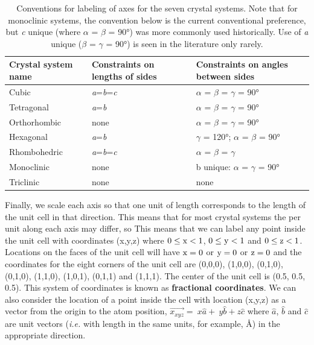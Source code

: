 \begin{table}
\centering
\caption{Conventions for labeling of axes for the seven crystal systems. Note that for monoclinic systems, the convention below is the current conventional preference, but \textit{c} unique (where $\alpha$ = $\beta$ = 90°) was more commonly used historically. Use of \textit{a} unique ($\beta$ = $\gamma$ = 90°) is seen in the literature only rarely.}
\label{tab:conventions}

\begin{tabular}{| l | p{} | p{} |}

\hline
Crystal system name & Constraints on lengths of sides & Constraints on angles between sides \\
\hline
Cubic & \textit{a}=\textit{b}=\textit{c} & $\alpha$ = $\beta$ = $\gamma$ = 90° \\
\hline
Tetragonal & \textit{a}=\textit{b} & $\alpha$ = $\beta$ = $\gamma$ = 90° \\
\hline
Orthorhombic & none & $\alpha$ = $\beta$ = $\gamma$ = 90° \\
\hline
Hexagonal & \textit{a}=\textit{b} & $\gamma$ = 120°; $\alpha$ = $\beta$ = 90° \\
\hline
Rhombohedric & \textit{a}=\textit{b}=\textit{c} & $\alpha$ = $\beta$ = $\gamma$ \\
\hline
Monoclinic & none & b unique: $\alpha$ = $\gamma$ = 90° \\
\hline
Triclinic & none & none \\
\hline

\end{tabular}

\end{table}

 Finally, we scale each axis so that one unit of length corresponds to the length of the unit cell in that direction. This means that for most crystal systems the per unit along each axis may differ, so This means that we can label any point inside the unit cell with coordinates (x,y,z) where $0\leq \rm x<1$, $0\leq \rm y<1$ and $0\leq\rm z<1$. Locations on the faces of the unit cell will have $\rm x=0$ or $\rm y=0$ or $\rm z=0$ and the coordinates for the eight corners of the unit cell are (0,0,0), (1,0,0), (0,1,0), (0,1,0), (1,1,0), (1,0,1), (0,1,1) and (1,1,1). The center of the unit cell is (0.5, 0.5, 0.5). This system of coordinates is known as \textbf{fractional coordinates}. We can also consider the location of a point inside the cell with location (x,y,z) as a vector from the origin to the atom position, $\vec{x_{xyz}}=\ x\hat{a}+\ y\hat{b}+z\hat{c}$ where $\hat{a}$, $\hat{b}$ and $\hat{c}$ are unit vectors (\textit{i.e.} with length in the same units, for example, Å) in the appropriate direction.

